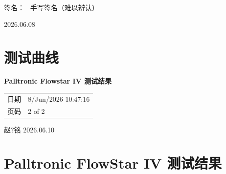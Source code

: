\documentclass[UTF8,10pt,a4paper,fontset=fandol]{ctexart}
\newcommand{\fieldvalue}[1]{#1}
\newcommand{\handwritten}[1]{#1}
\begin{document}
\noindent
签名：\ 
\fieldvalue{\handwritten{手写签名（难以辨认）}}

\hfill
\handwritten{2026.06.08}

\vfill

\section{测试曲线}

\noindent
\textbf{Palltronic Flowstar IV 测试结果}

\begin{tabular}{@{}ll@{}}
日期 & 8/Jun/2026 10:47:16\\
页码 & 2 of 2
\end{tabular}

\medskip

\noindent
\begin{minipage}{0.88\linewidth}
\centering
{}
\end{minipage}

\vspace{1em}

\handwritten{赵?铭}
\quad
\handwritten{2026.06.10}

\newpage

\section{Palltronic FlowStar IV 测试结果}
\end{document}
